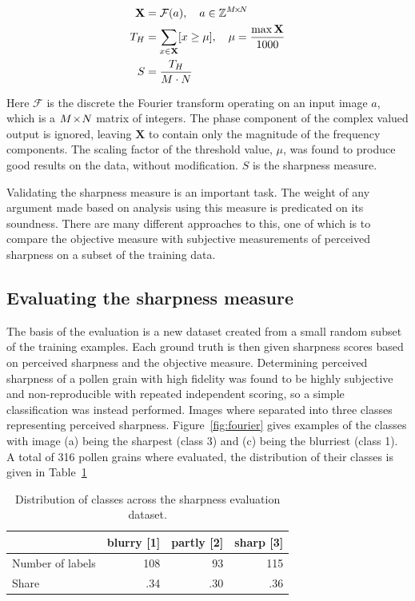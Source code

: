 \begin{equation}\label{eq:sharp}
  \begin{split}
    \mathbf{X} &= \mathcal{F}(a),\quad a\in \mathbb{Z}^{M\!\times \! N}\\
    T_H &= \sum_{x\in\mathbf{X}}[x\ge\mu],\quad \mu=\frac{\max \mathbf{X}}{1000}\\
    S &= \dfrac{T_H}{M\cdot N}
  \end{split}
\end{equation}

Here \(\mathcal{F}\) is the discrete the Fourier transform operating on an input image \(a\), which is a \(M\!\times \! N\) matrix of integers.
The phase component of the complex valued output is ignored, leaving \(\mathbf{X}\) to contain only the magnitude of the frequency components.
The scaling factor of the threshold value, \(\mu \), was found to produce good results on the data, without modification. \(S\) is the sharpness measure.

Validating the sharpness measure is an important task.
The weight of any argument made based on analysis using this measure is predicated on its soundness.
There are many different approaches to this, one of which is to compare the objective measure with subjective measurements of perceived sharpness on a subset of the training data.

\subsection{Evaluating the sharpness measure}
The basis of the evaluation is a new dataset created from a small random subset of the training examples.
Each ground truth is then given sharpness scores based on perceived sharpness and the objective measure.
Determining perceived sharpness of a pollen grain with high fidelity was found to be highly subjective and non-reproducible with repeated independent scoring, so a simple classification was instead performed.
Images where separated into three classes representing perceived sharpness.
Figure~\ref{fig:fourier} gives examples of the classes with image (a) being the sharpest (class 3) and (c) being the blurriest (class 1).
A total of 316 pollen grains where evaluated, the distribution of their classes is given in Table~\ref{tab:sharpness}

\begin{table}[htbp]
  \caption[Sharpness dataset distribution]{Distribution of classes across the sharpness evaluation dataset.}\label{tab:sharpness}
  \centering
  \begin{tabular}{lrrr} \toprule
    & blurry [1] & partly [2] & sharp [3]  \\ \midrule
    Number of labels & 108 & 93  & 115 \\
    Share            & .34 & .30 & .36 \\ \bottomrule
  \end{tabular}
\end{table}


